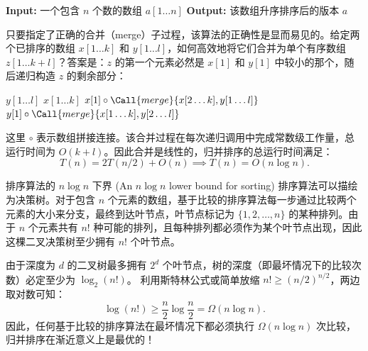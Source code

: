 \begin{tcolorbox}[colback=white,colframe=gray!50!black,title={\textbf{算法}\quad 归并排序 (\texttt{mergesort})}]
\begin{algorithmic}[1]
    \State \textbf{Input:} 一个包含 $n$ 个数的数组 $a[1 \dots n]$
    \State \textbf{Output:} 该数组升序排序后的版本
        \State \Return {}
    \Else
        \State \Return $a$
    \EndIf
\EndFunction
\end{algorithmic}
\end{tcolorbox}

只要指定了正确的合并（merge）子过程，该算法的正确性是显而易见的。给定两个已排序的数组 $x[1 \dots k]$ 和 $y[1 \dots l]$，如何高效地将它们合并为单个有序数组 $z[1 \dots k + l]$？答案是：$z$ 的第一个元素必然是 $x[1]$ 和 $y[1]$ 中较小的那个，随后递归构造 $z$ 的剩余部分：

\begin{tcolorbox}[colback=white,colframe=gray!50!black,title={\textbf{算法}\quad 合并子过程 (\texttt{merge})}]
\begin{algorithmic}[1]
     \Return $y[1 \dots l]$ \EndIf
     \Return $x[1 \dots k]$ \EndIf
        \State \Return $x[1] \circ \Call{merge}{x[2 \dots k], y[1 \dots l]}$
    \Else
        \State \Return $y[1] \circ \Call{merge}{x[1 \dots k], y[2 \dots l]}$
    \EndIf
\EndFunction
\end{algorithmic}
\end{tcolorbox}

这里 $\circ$ 表示数组拼接连接。该合并过程在每次递归调用中完成常数级工作量，总运行时间为 $O(k + l)$。因此合并是线性的，归并排序的总运行时间满足：
\[
T(n) = 2T(n/2) + O(n) \implies T(n) = O(n \log n).
\]

\begin{sidebarbox}{排序算法的 $n \log n$ 下界 (An $n \log n$ lower bound for sorting)}
排序算法可以描绘为决策树。对于包含 $n$ 个元素的数组，基于比较的排序算法每一步通过比较两个元素的大小来分支，最终到达叶节点，叶节点标记为 $\{1, 2, \dots, n\}$ 的某种排列。由于 $n$ 个元素共有 $n!$ 种可能的排列，且每种排列都必须作为某个叶节点出现，因此这棵二叉决策树至少拥有 $n!$ 个叶节点。

由于深度为 $d$ 的二叉树最多拥有 $2^d$ 个叶节点，树的深度（即最坏情况下的比较次数）必定至少为 $\log_2(n!)$。
利用斯特林公式或简单放缩 $n! \ge (n/2)^{n/2}$，两边取对数可知：
\[
\log(n!) \ge \frac{n}{2} \log \frac{n}{2} = \Omega(n \log n).
\]
因此，任何基于比较的排序算法在最坏情况下都必须执行 $\Omega(n \log n)$ 次比较，归并排序在渐近意义上是最优的！
\end{sidebarbox}

